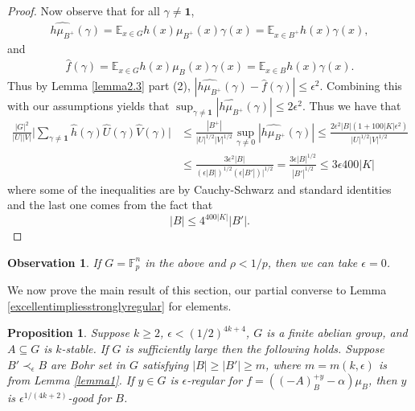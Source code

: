 \documentclass[11pt]{article}
\newtheorem{proposition}{Proposition}
\newtheorem{observation}{Observation}
\theoremstyle{definition}
\begin{document}
\begin{proof}
Now observe that for all $\gamma \neq \mathbf{1}$, 
\begin{align*}
\widehat{h\mu_{B^+}}(\gamma)=\mathbb{E}_{x\in G}h(x)\mu_{B^+}(x) \gamma(x)=\mathbb{E}_{x\in B^+}h(x)\gamma(x),
\end{align*}
and
\begin{align*}
\widehat{f}(\gamma)=\mathbb{E}_{x\in G}h(x)\mu_B(x) \gamma(x)=\mathbb{E}_{x\in B}h(x)\gamma(x).
\end{align*}
Thus by Lemma \ref{lemma2.3} part (2), $|\widehat{h\mu_{B^+}}(\gamma)-\widehat{f}(\gamma)|\leq \epsilon^2$. Combining this with our assumptions yields that $\sup_{\gamma \neq \mathbf{1}}|\widehat{h\mu_{B^+}}(\gamma)|\leq 2\epsilon^2$.  Thus we have that 
\begin{align*}
\frac{|G|^2}{|U||V|}\Big|\sum_{\gamma \neq \mathbf{1} }\widehat{h}(\gamma)\hat{U}(\gamma)\hat{V}(\gamma)\Bigg|&\leq \frac{|B^+|}{|U|^{1/2}|V|^{1/2}}\sup_{\gamma \neq 0}|\widehat{h\mu_{B^+}}(\gamma)|\leq \frac{2\epsilon^2|B|(1+100|K|\epsilon^2)}{|U|^{1/2}|V|^{1/2}}\\
&\leq  \frac{3\epsilon^2 |B|}{(\epsilon|B|)^{1/2}(\epsilon|B'|)|^{1/2}}= \frac{3\epsilon|B|^{1/2}}{|B'|^{1/2}}\leq 3\epsilon 400|K|
\end{align*}
where some of the inequalities are by Cauchy-Schwarz and standard identities and the last one comes from the fact that
$$
|B|\leq 4^{400|K|}|B'|.
$$
\end{proof}

\begin{observation}
If $G=\mathbb{F}_p^n$ in the above and $\rho<1/p$, then we can take $\epsilon=0$.
\end{observation}


We now prove the main result of this section, our partial converse to Lemma \ref{excellentimpliesstronglyregular} for elements.

\begin{proposition}\label{goodlem}
Suppose $k\geq 2$, $\epsilon<(1/2)^{4k+4}$, $G$ is a finite abelian group, and $A\subseteq G$ is $k$-stable. If $G$ is sufficiently large then the following holds.  Suppose $B'\prec_{\epsilon} B$ are Bohr set in $G$ satisfying $|B|\geq |B'|\geq m$, where $m=m(k,\epsilon)$ is from Lemma \ref{lemma1}. If $y\in G$ is $\epsilon$-regular for $f=((-A)^{+y}_B-\alpha)\mu_B$, then $y$ is $\epsilon^{1/(4k+2)}$-good for $B$.
\end{proposition}
\end{document}
